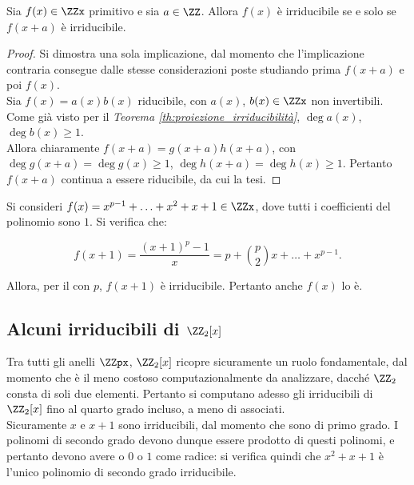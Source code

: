 \begin{theorem}
    Sia $f(x) \in \ZZx$ primitivo e sia $a \in \ZZ$. Allora $f(x)$ è
    irriducibile se e solo se $f(x+a)$ è irriducibile.
\end{theorem}

\begin{proof}
    Si dimostra una sola implicazione, dal momento che l'implicazione
    contraria consegue dalle stesse considerazioni poste
    studiando prima $f(x+a)$ e poi $f(x)$. \\

    Sia $f(x)=a(x)b(x)$ riducibile, con $a(x)$, $b(x) \in \ZZx$ non
    invertibili. Come già visto per il \textit{Teorema
        \ref{th:proiezione_irriducibilità}}, $\deg a(x)$, $\deg b(x) \geq 1$. \\

    Allora chiaramente $f(x+a)=g(x+a)h(x+a)$, con $\deg g(x+a) =
        \deg g(x) \geq 1$, $\deg h(x+a) = \deg h(x) \geq 1$. Pertanto
    $f(x+a)$ continua a essere riducibile, da cui la tesi.
\end{proof}

\begin{example}
    Si consideri $f(x) = x^{p-1}+\ldots+x^2+x+1 \in \ZZx$, dove
    tutti i coefficienti del polinomio sono $1$. Si verifica che:

    \[ f(x+1)=\frac{(x+1)^p-1}x = p+\binom{p}{2}x+\ldots+x^{p-1}. \]

    Allora, per il  con $p$, $f(x+1)$ è
    irriducibile. Pertanto anche $f(x)$ lo è.
\end{example}

\subsection{Alcuni irriducibili di $\ZZ_2[x]$}

Tra tutti gli anelli $\ZZpx$, $\ZZ_2[x]$ ricopre sicuramente
un ruolo fondamentale, dal momento che è il meno costoso
computazionalmente da analizzare, dacché $\ZZ_2$ consta
di soli due elementi. Pertanto si computano adesso gli
irriducibili di $\ZZ_2[x]$ fino al quarto grado incluso, a meno
di associati. \\

Sicuramente $x$ e $x+1$ sono irriducibili, dal momento che sono di
primo grado. I polinomi di secondo grado devono dunque essere
prodotto di questi polinomi, e pertanto devono avere o $0$ o
$1$ come radice: si verifica quindi che $x^2+x+1$ è l'unico
polinomio di secondo grado irriducibile. \\

